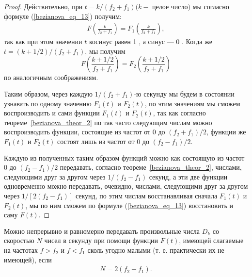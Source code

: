 \begin{proof}
Действительно, при $t=k /\left(f_2+f_1\right)(k-$ целое число) мы согласно формуле (\ref{bezianova_eq_13}) получим:
\begin{equation}\label{bezianova_eq_18}
\begin{gathered}
F\left(\frac{k}{f_2+f_1}\right)=F_1\left(\frac{k}{f_2+f_1}\right),
\end{gathered}
\end{equation}
так как при этом значении $t$ косинус равен 1 , а синус --- 0 . Когда же $t=(k+1 / 2) /\left(f_2+f_1\right)$, мы получим
$$
F\left(\frac{k+1 / 2}{f_2+f_1}\right)=F_2\left(\frac{k+1 / 2}{f_2+f_1}\right)
$$
по аналогичным соображениям.

Таким образом, через каждую $1 /\left(f_2+f_1\right)$-ю секунду мы будем в состоянии узнавать по одному значению $F_1(t)$ и $F_2(t)$, по этим значениям мы сможем воспроизводить и сами функции $F_1(t)$ и $F_2(t)$, так как согласно теореме~\ref{bezianova_theor_2} по так часто следующим числам можно воспроизводить функции, состоящие из частот от 0 до $\left(f_2+f_1\right) / 2$, функции же $F_1(t)$ и $F_2(t)$ состоят лишь из частот от 0 до $\left(f_2-f_1\right) / 2$.

Каждую из полученных таким образом функций можно как состоящую из частот 0 до $\left(f_2-f_1\right) / 2$ передавать, согласно теореме~\ref{bezianova_theor_2}, числами, следующими друг за другом через $1 /\left(f_2-f_1\right)$ секунд, а эти две функции одновременно можно передавать, очевидно, числами, следующими друг за другом через $1 /\left[2\left(f_2-f_1\right)\right]$ секунд, по этим числам восстанавливая сначала $F_1(t)$ и $F_2(t)$, мы по ним сможем по формуле (\ref{bezianova_eq_13}) восстановить и саму $F(t)$.
\end{proof}

\begin{theorem}\label{bezianova_theor_6} Можно непрерывно и равномерно передавать произвольные числа $D_k$ со скоростью $N$ чисел в секунду при помощи функции $F(t)$, имеющей слагаемые на частотах $f>f_2$ и $f<f_1$ сколь угодно малыми (т. е. практически их не имеющей), если
\begin{equation} \label{bezianova_eq_19}
\begin{gathered}
N=2\left(f_2-f_1\right). 
\end{gathered}
\end{equation}
\end{theorem}

